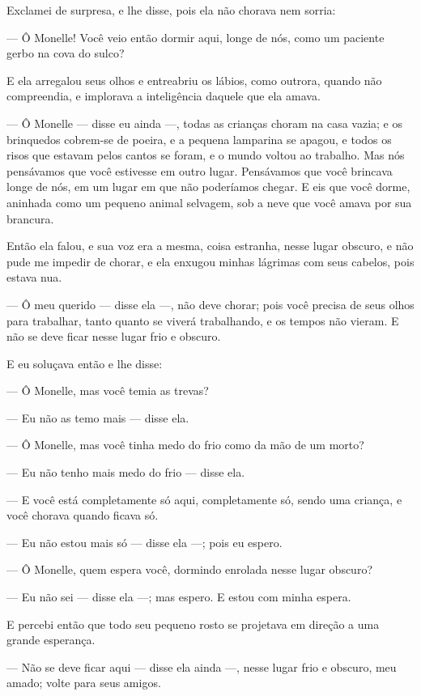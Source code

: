 Exclamei de surpresa, e lhe disse, pois ela não chorava nem sorria:

--- Ô Monelle! Você veio então dormir aqui, longe de nós, como um
paciente gerbo na cova do sulco?

E ela arregalou seus olhos e entreabriu os lábios, como outrora, quando
não compreendia, e implorava a inteligência daquele que ela amava.

--- Ô Monelle --- disse eu ainda ---, todas as crianças choram na casa vazia; e
os brinquedos cobrem-se de poeira, e a pequena lamparina se apagou, e todos
os risos que estavam pelos cantos se foram, e o mundo voltou ao trabalho.
Mas nós pensávamos que você estivesse em outro lugar. Pensávamos que você
brincava longe de nós, em um lugar em que não poderíamos chegar. E eis que
você dorme, aninhada como um pequeno animal selvagem, sob a neve que você
amava por sua brancura.

Então ela falou, e sua voz era a mesma, coisa estranha, nesse lugar
obscuro, e não pude me impedir de chorar, e ela enxugou minhas lágrimas
com seus cabelos, pois estava nua.

--- Ô meu querido --- disse ela ---, não deve chorar; pois você precisa de seus
olhos para trabalhar, tanto quanto se viverá trabalhando, e os tempos não
vieram. E não se deve ficar nesse lugar frio e obscuro.

E eu soluçava então e lhe disse:

--- Ô Monelle, mas você temia as trevas?

--- Eu não as temo mais --- disse ela.

--- Ô Monelle, mas você tinha medo do frio como da mão de um morto?

--- Eu não tenho mais medo do frio --- disse ela.

--- E você está completamente só aqui, completamente só, sendo uma
criança, e você chorava quando ficava só.

--- Eu não estou mais só --- disse ela ---; pois eu espero.

--- Ô Monelle, quem espera você, dormindo enrolada nesse lugar obscuro?

--- Eu não sei --- disse ela ---; mas espero. E estou com minha espera.

E percebi então que todo seu pequeno rosto se projetava em direção
a uma grande esperança.

--- Não se deve ficar aqui --- disse ela ainda ---, nesse lugar frio e obscuro,
meu amado; volte para seus amigos.

